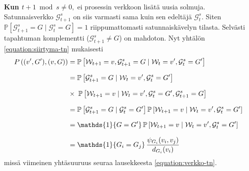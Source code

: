 \documentclass[finnish, 12pt, a4paper, sci, utf8, pdfa]{aaltothesis}
\newcommand{\Grandom}{\mathcal{G}}
\newcommand{\Wrandom}{\mathcal{W}}
\newcommand{\indicator}{\mathopen{\mathds{1}}}
\newcommand*{\prob}{\mathbb{P}}
\begin{document}
{\parindent0pt
\textbf{Kun $ t + 1 \bmod s \neq 0, $} ei prosessin verkkoon lisätä uusia solmuja. Satunnaisverkko $ \Grandom^{s}_{t+1} $ on siis varmasti sama kuin sen edeltäjä $ \Grandom^{s}_{t} $. Siten
$ \prob \left[ \Grandom^{s}_{t+1} = G \mid \Grandom^{s}_{t} = G \right] = 1 $
riippumattomasti satunnaiskävelyn tilasta. Selvästi tapahtuman komplementti ($ \Grandom^{s}_{t+1} \neq G $) on mahdoton. Nyt yhtälön \ref{equation:siirtyma-tn} mukaisesti
\begin{equation*}
   \setlength{\jot}{10pt}
   \begin{aligned}
   P\left( (v', G'), (v, G) \right) &= \prob \left[ \Wrandom_{t+1} = v, \Grandom^{s}_{t+1} = G \mid \Wrandom_{t} = v', \Grandom^{s}_{t} = G' \right] \\
   &= \prob \left[ \Grandom^{s}_{t+1} = G \mid \Wrandom_{t} = v', \Grandom^{s}_{t} = G' \right] \\
   &\times \; \prob \left[ \Wrandom_{t+1} = v \mid \Wrandom_{t} = v', \Grandom^{s}_{t} = G', \Grandom^{s}_{t+1} = G \right] \\
   &= \prob \left[ \Grandom^{s}_{t+1} = G \mid \Grandom^{s}_{t} = G' \right] \prob \left[ \Wrandom_{t+1} = v \mid \Wrandom_{t} = v', \Grandom^{s}_{t} = G' \right] \\
   &= \indicator \left\{ G = G' \right\} \prob \left[ \Wrandom_{t+1} = v \mid \Wrandom_{t} = v', \Grandom^{s}_{t} = G' \right] \\
   &= \indicator \left\{ G_{i} = G_{j} \right\} \frac{\psi_{G_{i}}(v_{i}, v_{j})}{d_{G_{i}}(v_{i})}
   \end{aligned}
\end{equation*}
missä viimeinen yhtäsuuruus seuraa lausekkeesta \ref{equation:verkko-tn}.

\vspace{0.5cm}

}
\end{document}
